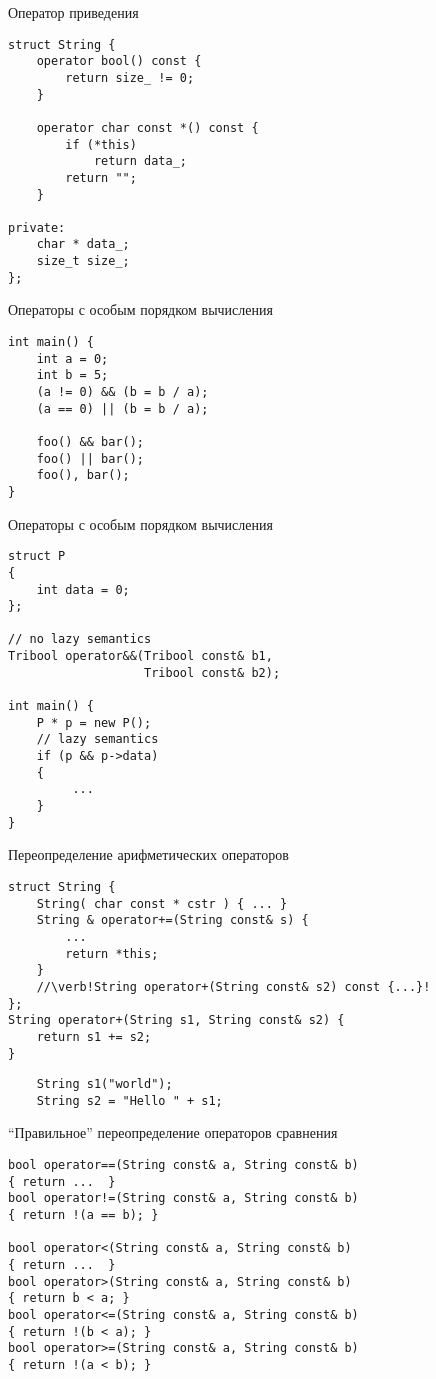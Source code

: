 \documentclass{beamer}
\begin{document}
\begin{frame}[fragile]{Оператор приведения}
    \begin{lstlisting}
struct String {
    operator bool() const {
        return size_ != 0;
    }

    operator char const *() const {
        if (*this)
            return data_;
        return "";
    }

private:
    char * data_;
    size_t size_;
};
    \end{lstlisting}
\end{frame}

\begin{frame}[fragile]{Операторы с особым порядком вычисления}
    \begin{lstlisting}
int main() {
    int a = 0;
    int b = 5;
    (a != 0) && (b = b / a);
    (a == 0) || (b = b / a);

    foo() && bar();
    foo() || bar();
    foo(), bar();
}
    \end{lstlisting}
\end{frame}

\begin{frame}[fragile]{Операторы с особым порядком вычисления}
    \begin{lstlisting}
struct P
{
    int data = 0;
};

// no lazy semantics
Tribool operator&&(Tribool const& b1, 
                   Tribool const& b2);

int main() {
    P * p = new P();
    // lazy semantics
    if (p && p->data)
    {
         ...
    }
}
    \end{lstlisting}
\end{frame}

\begin{frame}[fragile]{Переопределение арифметических операторов}
    \begin{lstlisting}
struct String {
    String( char const * cstr ) { ... }
    String & operator+=(String const& s) {
        ...
        return *this;    
    }
    //\verb!String operator+(String const& s2) const {...}!
};
String operator+(String s1, String const& s2) { 
    return s1 += s2; 
}
    \end{lstlisting}
    \begin{lstlisting}
    String s1("world");
    String s2 = "Hello " + s1;
    \end{lstlisting}
\end{frame}

\begin{frame}[fragile]{``Правильное'' переопределение операторов сравнения}
    \begin{lstlisting}[basicstyle=\fontsize{9pt}{1em}\ttfamily]
bool operator==(String const& a, String const& b) 
{ return ...  }
bool operator!=(String const& a, String const& b) 
{ return !(a == b); }

bool operator<(String const& a, String const& b) 
{ return ...  }
bool operator>(String const& a, String const& b) 
{ return b < a; }
bool operator<=(String const& a, String const& b) 
{ return !(b < a); }
bool operator>=(String const& a, String const& b) 
{ return !(a < b); }
    \end{lstlisting}
\end{frame}
\end{document}
